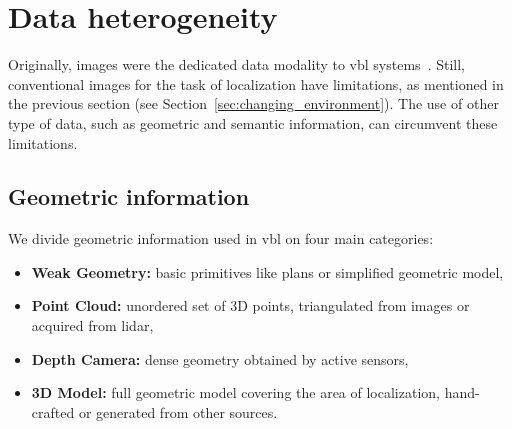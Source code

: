 \section{Data heterogeneity}
\label{sec:application}	



	Originally, images were the dedicated data modality to \ac{vbl} systems~\citep{Robertson2004}. Still, conventional images for the task of localization have limitations, as mentioned in the previous section (see Section~\ref{sec:changing_environment}). The use of other type of data, such as geometric and semantic information, can circumvent these limitations.

	\subsection{Geometric information}
		\label{subsec:geometric_info}		
		We divide geometric information used in \ac{vbl} on four main categories:
		\begin{itemize}
			\item \textbf{Weak Geometry:} basic primitives like plans or simplified geometric model,
			\item \textbf{Point Cloud:} unordered set of 3D points, triangulated from images or acquired from lidar,
			\item \textbf{Depth Camera:} dense geometry obtained by active sensors,
			\item \textbf{3D Model:} full geometric model covering the area of localization, hand-crafted or generated from other sources.
		\end{itemize}
        
